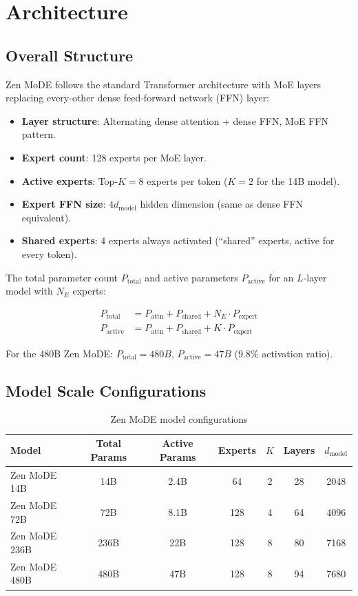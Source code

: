 \documentclass[11pt,a4paper]{article}
\begin{document}
\section{Architecture}

\subsection{Overall Structure}

Zen MoDE follows the standard Transformer architecture with MoE layers replacing every-other dense feed-forward network (FFN) layer:

\begin{itemize}
  \item \textbf{Layer structure}: Alternating dense attention + {dense FFN, MoE FFN} pattern.
  \item \textbf{Expert count}: 128 experts per MoE layer.
  \item \textbf{Active experts}: Top-$K=8$ experts per token ($K=2$ for the 14B model).
  \item \textbf{Expert FFN size}: $4d_{\text{model}}$ hidden dimension (same as dense FFN equivalent).
  \item \textbf{Shared experts}: 4 experts always activated (``shared'' experts, active for every token).
\end{itemize}

The total parameter count $P_{\text{total}}$ and active parameters $P_{\text{active}}$ for an $L$-layer model with $N_E$ experts:

\begin{align}
P_{\text{total}} &= P_{\text{attn}} + P_{\text{shared}} + N_E \cdot P_{\text{expert}} \\
P_{\text{active}} &= P_{\text{attn}} + P_{\text{shared}} + K \cdot P_{\text{expert}}
\end{align}

For the 480B Zen MoDE: $P_{\text{total}} = 480B$, $P_{\text{active}} = 47B$ (9.8\% activation ratio).

\subsection{Model Scale Configurations}

\begin{table}[H]
\centering
\caption{Zen MoDE model configurations}
\label{tab:configs}
\begin{tabular}{lcccccc}
\toprule
Model & Total Params & Active Params & Experts & $K$ & Layers & $d_{\text{model}}$ \\
\midrule
Zen MoDE 14B & 14B & 2.4B & 64 & 2 & 28 & 2048 \\
Zen MoDE 72B & 72B & 8.1B & 128 & 4 & 64 & 4096 \\
Zen MoDE 236B & 236B & 22B & 128 & 8 & 80 & 7168 \\
Zen MoDE 480B & 480B & 47B & 128 & 8 & 94 & 7680 \\
\bottomrule
\end{tabular}
\end{table}
\end{document}
